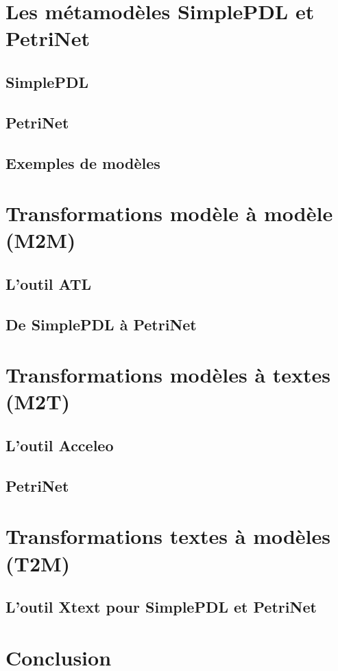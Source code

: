 \documentclass{rapport_gls}
\begin{document}


\newpage

\tableofcontents

\newpage

\chapter{Les métamodèles SimplePDL et PetriNet}

\section{SimplePDL}

\newpage
\section{PetriNet}

\newpage
\section{Exemples de modèles}


\chapter{Transformations modèle à modèle (M2M)}

\section{L'outil ATL}

\section{De SimplePDL à PetriNet}


\chapter{Transformations modèles à textes (M2T)}

\section{L'outil Acceleo}

\newpage
\section{PetriNet}


\chapter{Transformations textes à modèles (T2M)}

\section{L'outil Xtext pour SimplePDL et PetriNet}


\chapter{Conclusion}

\end{document}
